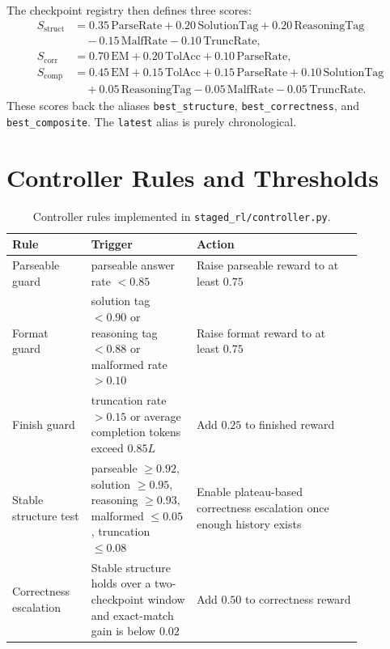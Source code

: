 \documentclass{article} %
\begin{document}
The checkpoint registry then defines three scores:
\begin{align}
S_{\mathrm{struct}} &= 0.35\,\mathrm{ParseRate} + 0.20\,\mathrm{SolutionTag}
+ 0.20\,\mathrm{ReasoningTag} \nonumber\\
&\quad - 0.15\,\mathrm{MalfRate} - 0.10\,\mathrm{TruncRate},\\
S_{\mathrm{corr}} &= 0.70\,\mathrm{EM} + 0.20\,\mathrm{TolAcc} + 0.10\,\mathrm{ParseRate},\\
S_{\mathrm{comp}} &= 0.45\,\mathrm{EM} + 0.15\,\mathrm{TolAcc} + 0.15\,\mathrm{ParseRate}
+ 0.10\,\mathrm{SolutionTag} \nonumber\\
&\quad + 0.05\,\mathrm{ReasoningTag}
- 0.05\,\mathrm{MalfRate} - 0.05\,\mathrm{TruncRate}.
\end{align}
These scores back the aliases \texttt{best\_structure}, \texttt{best\_correctness}, and \texttt{best\_composite}. The \texttt{latest} alias is purely chronological.

\section{Controller Rules and Thresholds}

\begin{table}[t]
\centering
\small
\caption{Controller rules implemented in \texttt{staged\_rl/controller.py}.}
\label{tab:controller-rules}
\begin{tabular}{L{0.19\linewidth} L{0.26\linewidth} L{0.41\linewidth}}
\toprule
Rule & Trigger & Action \\
\midrule
Parseable guard & parseable answer rate $< 0.85$ & Raise parseable reward to at least $0.75$ \\
Format guard & solution tag $< 0.90$ or reasoning tag $< 0.88$ or malformed rate $> 0.10$ & Raise format reward to at least $0.75$ \\
Finish guard & truncation rate $> 0.15$ or average completion tokens exceed $0.85L$ & Add $0.25$ to finished reward \\
Stable structure test & parseable $\ge 0.92$, solution $\ge 0.95$, reasoning $\ge 0.93$, malformed $\le 0.05$, truncation $\le 0.08$ & Enable plateau-based correctness escalation once enough history exists \\
Correctness escalation & Stable structure holds over a two-checkpoint window and exact-match gain is below $0.02$ & Add $0.50$ to correctness reward \\
\bottomrule
\end{tabular}
\end{table}
\end{document}

